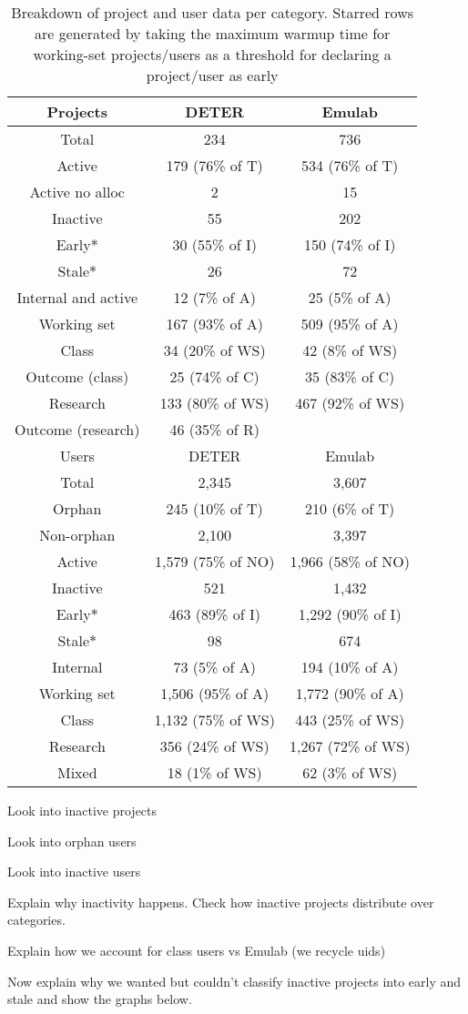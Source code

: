 \begin{table}[htdp] \begin{center} \begin{tabular}{|c|c|c|} \hline
Projects & DETER & Emulab \\ \hline Total & 234 & 736 \\ Active & 179
(76\% of T) & 534 (76\% of T) \\ Active no alloc & 2 & 15 \\ Inactive &
55 & 202 \\ Early$*$ & 30 (55\% of I) & 150 (74\% of I)\\ Stale$*$ & 26
& 72 \\ Internal and active & 12 (7\% of A) & 25 (5\% of A)\\ Working
set  & 167 (93\% of A) & 509 (95\% of A)\\ Class & 34 (20\% of WS) & 42
(8\% of WS) \\ Outcome (class) & 25 (74\% of C) & 35 (83\% of C)\\
Research & 133 (80\% of WS) &  467 (92\% of WS)\\ Outcome (research) &
46 (35\% of R) & \\ \hline Users & DETER & Emulab\\ \hline Total & 2,345
&  3,607 \\ Orphan & 245 (10\% of T) & 210 (6\% of T)\\ Non-orphan &
2,100 & 3,397\\ Active & 1,579 (75\% of NO) & 1,966 (58\% of NO)\\
Inactive & 521 & 1,432 \\ Early$*$ & 463 (89\% of I) & 1,292 (90\% of
I)\\ Stale$*$ & 98 & 674 \\ Internal &  73 (5\% of A) & 194 (10\% of
A)\\ Working set  & 1,506 (95\% of A) & 1,772 (90\% of A)\\ Class &
1,132 (75\% of WS) & 443 (25\% of WS)\\ Research & 356 (24\% of WS)  &
1,267 (72\% of WS)\\ Mixed & 18 (1\% of WS) & 62 (3\% of WS)\\ \hline
\end{tabular} \end{center} \label{cleaning} \caption{Breakdown of
project and user data per category. Starred rows are generated by taking
the maximum warmup time for working-set projects/users as a threshold
for declaring a project/user as early} \end{table}%

Look into inactive projects

Look into orphan users

Look into inactive users

Explain why inactivity happens. Check how inactive projects distribute
over categories.

Explain how we account for class users vs Emulab (we recycle uids)

Now explain why we wanted but couldn't classify inactive projects into
early and stale and show the graphs below.